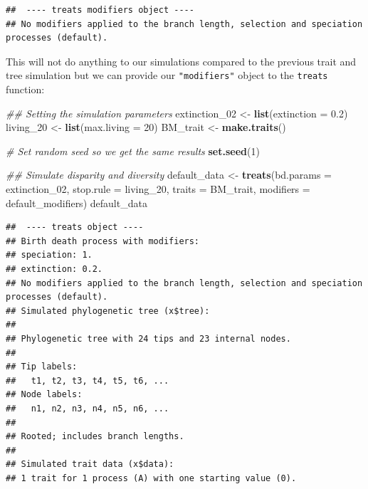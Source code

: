 \documentclass[
]{book}
\newenvironment{Shaded}{\begin{snugshade}}{\end{snugshade}}
\newcommand{\CommentTok}[1]{\textcolor[rgb]{0.56,0.35,0.01}{\textit{#1}}}
\newcommand{\DataTypeTok}[1]{\textcolor[rgb]{0.13,0.29,0.53}{#1}}
\newcommand{\DecValTok}[1]{\textcolor[rgb]{0.00,0.00,0.81}{#1}}
\newcommand{\FloatTok}[1]{\textcolor[rgb]{0.00,0.00,0.81}{#1}}
\newcommand{\KeywordTok}[1]{\textcolor[rgb]{0.13,0.29,0.53}{\textbf{#1}}}
\newcommand{\NormalTok}[1]{#1}
\newcommand{\StringTok}[1]{\textcolor[rgb]{0.31,0.60,0.02}{#1}}
\begin{document}
\begin{verbatim}
##  ---- treats modifiers object ---- 
## No modifiers applied to the branch length, selection and speciation processes (default).
\end{verbatim}

This will not do anything to our simulations compared to the previous trait and tree simulation but we can provide our \texttt{"modifiers"} object to the \texttt{treats} function:

\begin{Shaded}
\begin{Highlighting}[]
\CommentTok{\#\# Setting the simulation parameters}
\NormalTok{extinction\_}\DecValTok{02}\NormalTok{ \textless{}{-}}\StringTok{ }\KeywordTok{list}\NormalTok{(}\DataTypeTok{extinction =} \FloatTok{0.2}\NormalTok{)}
\NormalTok{living\_}\DecValTok{20}\NormalTok{     \textless{}{-}}\StringTok{ }\KeywordTok{list}\NormalTok{(}\DataTypeTok{max.living =} \DecValTok{20}\NormalTok{)}
\NormalTok{BM\_trait      \textless{}{-}}\StringTok{ }\KeywordTok{make.traits}\NormalTok{()}

\CommentTok{\# Set random seed so we get the same results}
\KeywordTok{set.seed}\NormalTok{(}\DecValTok{1}\NormalTok{)}

\CommentTok{\#\# Simulate disparity and diversity}
\NormalTok{default\_data \textless{}{-}}\StringTok{ }\KeywordTok{treats}\NormalTok{(}\DataTypeTok{bd.params =}\NormalTok{ extinction\_}\DecValTok{02}\NormalTok{,}
                       \DataTypeTok{stop.rule =}\NormalTok{ living\_}\DecValTok{20}\NormalTok{,}
                       \DataTypeTok{traits    =}\NormalTok{ BM\_trait,}
                       \DataTypeTok{modifiers =}\NormalTok{ default\_modifiers)}
\NormalTok{default\_data}
\end{Highlighting}
\end{Shaded}

\begin{verbatim}
##  ---- treats object ---- 
## Birth death process with modifiers:
## speciation: 1.
## extinction: 0.2.
## No modifiers applied to the branch length, selection and speciation processes (default).
## Simulated phylogenetic tree (x$tree):
## 
## Phylogenetic tree with 24 tips and 23 internal nodes.
## 
## Tip labels:
##   t1, t2, t3, t4, t5, t6, ...
## Node labels:
##   n1, n2, n3, n4, n5, n6, ...
## 
## Rooted; includes branch lengths.
## 
## Simulated trait data (x$data):
## 1 trait for 1 process (A) with one starting value (0).
\end{verbatim}
\end{document}
